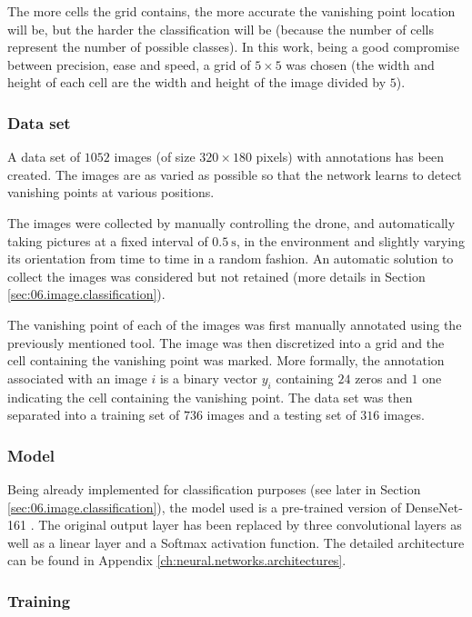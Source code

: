 The more cells the grid contains, the more accurate the vanishing point location will be, but the harder the classification will be (because the number of cells represent the number of possible classes). In this work, being a good compromise between precision, ease and speed, a grid of $\num{5} \times \num{5}$ was chosen (the width and height of each cell are the width and height of the image divided by $\num{5}$).

\subsubsection{Data set}

A data set of $\num{1052}$ images (of size $\num{320} \times \num{180}$ pixels) with annotations has been created. The images are as varied as possible so that the network learns to detect vanishing points at various positions.

The images were collected by manually controlling the drone, and automatically taking pictures at a fixed interval of $\SI{0.5}{\second}$, in the environment and slightly varying its orientation from time to time in a random fashion. An automatic solution to collect the images was considered but not retained (more details in Section \ref{sec:06.image.classification}).

The vanishing point of each of the images was first manually annotated using the previously mentioned tool. The image was then discretized into a grid and the cell containing the vanishing point was marked. More formally, the annotation associated with an image $i$ is a binary vector $y_i$ containing $\num{24}$ zeros and $\num{1}$ one indicating the cell containing the vanishing point. The data set was then separated into a training set of $\num{736}$ images and a testing set of $\num{316}$ images.

\subsubsection{Model}

Being already implemented for classification purposes (see later in Section \ref{sec:06.image.classification}), the model used is a pre-trained version of DenseNet-161 \cite{simonyan2014very}. The original output layer has been replaced by three convolutional layers as well as a linear layer and a Softmax activation function. The detailed architecture can be found in Appendix \ref{ch:neural.networks.architectures}.

\subsubsection{Training}

